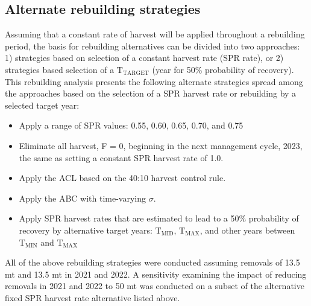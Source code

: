 \documentclass[11pt,
  english,
  a4paper,
]{article}
\begin{document}
\leavevmode\tagmcend\tagstructend\par


\hypertarget{alternate-rebuilding-strategies}{%
\subsection{Alternate rebuilding strategies}\label{alternate-rebuilding-strategies}}

\leavevmode\tagmcend\tagstructend


Assuming that a constant rate of harvest will be applied throughout a rebuilding period, the basis for rebuilding alternatives can be divided into two approaches: 1) strategies based on selection of a constant harvest rate (SPR rate), or 2) strategies based selection of a {\(\text{T}_\text{TARGET}\)\leavevmode\tagmcend\tagstructend} (year for 50\% probability of recovery). This rebuilding analysis presents the following alternate strategies spread among the approaches based on the selection of a SPR harvest rate or rebuilding by a selected target year:

\leavevmode\tagmcend\tagstructend\par

\begin{itemize}
    \item Apply a range of SPR values: 0.55, 0.60, 0.65, 0.70, and 0.75 
    \item Eliminate all harvest, F = 0, beginning in the next management cycle, 2023, the same as setting a constant SPR harvest rate of 1.0.
    \item Apply the ACL based on the 40:10 harvest control rule.
    \item Apply the ABC with time-varying $\sigma$.
    \item Apply SPR harvest rates that are estimated to lead to a 50$\%$ probability of recovery by alternative target years: $\text{T}_\text{MID}$, $\text{T}_\text{MAX}$, and other years between $\text{T}_\text{MIN}$ and $\text{T}_\text{MAX}$
\end{itemize}


All of the above rebuilding strategies were conducted assuming removals of 13.5 mt and 13.5 mt in 2021 and 2022. A sensitivity examining the impact of reducing removals in 2021 and 2022 to 50 mt was conducted on a subset of the alternative fixed SPR harvest rate alternative listed above.
\end{document}
